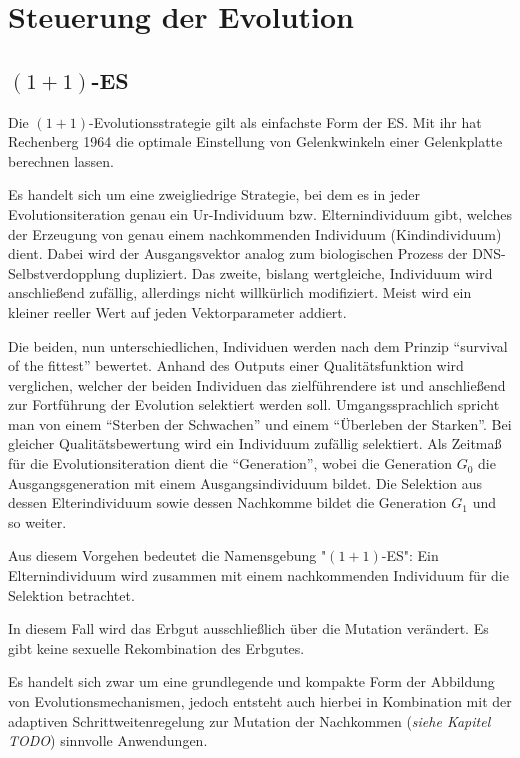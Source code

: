
\section{Steuerung der Evolution}

\subsection{$(1+1)$-ES}

Die $(1+1)$-Evolutionsstrategie gilt als einfachste Form der ES. Mit ihr hat Rechenberg 1964 die optimale Einstellung von Gelenkwinkeln einer Gelenkplatte berechnen lassen.

Es handelt sich um eine zweigliedrige Strategie, bei dem es in jeder Evolutionsiteration genau ein Ur-Individuum bzw. Elternindividuum gibt, welches der Erzeugung von genau einem nachkommenden Individuum (Kindindividuum) dient. Dabei wird der Ausgangsvektor analog zum biologischen Prozess der DNS-Selbstverdopplung dupliziert. Das zweite, bislang wertgleiche, Individuum wird anschließend zufällig, allerdings nicht willkürlich modifiziert. Meist wird ein kleiner reeller Wert auf jeden Vektorparameter addiert.

Die beiden, nun unterschiedlichen, Individuen werden nach dem Prinzip \enquote{survival of the fittest} bewertet.
Anhand des Outputs einer Qualitätsfunktion wird verglichen, welcher der beiden Individuen das zielführendere ist und anschließend zur Fortführung der Evolution selektiert werden soll.
Umgangssprachlich spricht man von einem \enquote{Sterben der Schwachen} und einem \enquote{Überleben der Starken}.
Bei gleicher Qualitätsbewertung wird ein Individuum zufällig selektiert.
Als Zeitmaß für die Evolutionsiteration dient die \enquote{Generation}, wobei die Generation $G_0$ die Ausgangsgeneration mit einem Ausgangsindividuum bildet. Die Selektion aus dessen Elterindividuum sowie dessen Nachkomme bildet die Generation $G_1$ und so weiter.

Aus diesem Vorgehen bedeutet die Namensgebung "$(1+1)$-ES": Ein Elternindividuum wird zusammen mit einem nachkommenden Individuum für die Selektion betrachtet.

In diesem Fall wird das Erbgut ausschließlich über die Mutation verändert. Es gibt keine sexuelle Rekombination des Erbgutes.

Es handelt sich zwar um eine grundlegende und kompakte Form der Abbildung von Evolutionsmechanismen, jedoch entsteht auch hierbei in Kombination mit der adaptiven Schrittweitenregelung zur Mutation der Nachkommen (\textit{siehe Kapitel TODO}) sinnvolle Anwendungen.

